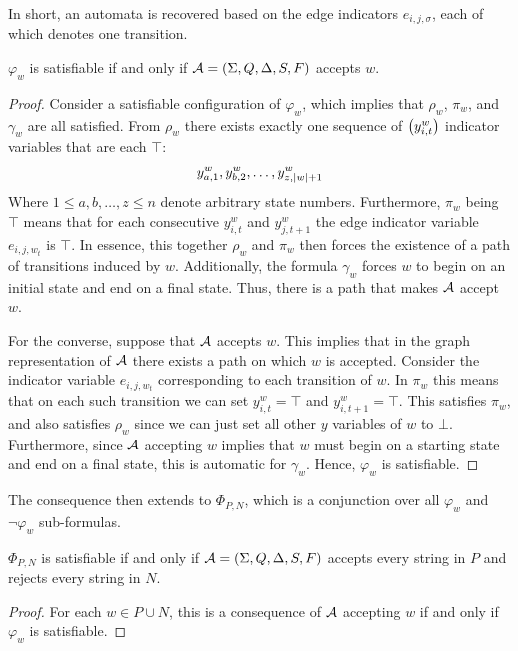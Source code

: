 In short, an automata is recovered based on the edge indicators
\(e_{i, j, \sigma}\),
each of which denotes one transition.

\begin{theorem}
  \(\varphi_w\) is satisfiable if and only if
  \(\mathcal{A} = \left(\Sigma, Q, \Delta, S, F\right)\) accepts \(w\).
\end{theorem}
\begin{proof}
  Consider a satisfiable configuration of \(\varphi_w\),
  which implies that \(\rho_w\), \(\pi_w\), and \(\gamma_w\)
  are all satisfied.
  From \(\rho_w\)
  there exists exactly one sequence of \(\left(y_{i, t}^w\right)\)
  indicator variables that are each \(\top\):
  \begin{align*}
    y_{a, 1}^w, y_{b, 2}^w, \ldots, y_{z, \left\lvert w\right\rvert + 1}^w
  \end{align*}
  Where \(1 \leq a, b, \ldots, z \leq n\) denote arbitrary state numbers.
  Furthermore, \(\pi_w\) being \(\top\) means that for each consecutive
  \(y_{i, t}^w\) and \(y_{j, t + 1}^w\) the edge indicator variable
  \(e_{i, j, w_{t}}\) is \(\top\).
  In essence, this together \(\rho_w\) and \(\pi_w\) then forces
  the existence of a path of transitions induced by \(w\).
  Additionally, the formula \(\gamma_w\) forces \(w\) to begin on an
  initial state and end on a final state.
  Thus, there is a path that makes \(\mathcal{A}\) accept \(w\).

  For the converse, suppose that \(\mathcal{A}\) accepts \(w\).
  This implies that in the graph representation of \(\mathcal{A}\)
  there exists a path on which \(w\) is accepted.
  Consider the indicator variable \(e_{i, j, w_t}\) corresponding to each
  transition of \(w\).
  In \(\pi_w\) this means that on each such transition we can set
  \(y_{i, t}^w = \top\) and \(y_{i, t + 1}^w = \top\).
  This satisfies \(\pi_w\),
  and also satisfies \(\rho_w\) since we can just set all other
  \(y\) variables of \(w\) to \(\bot\).
  Furthermore, since \(\mathcal{A}\) accepting \(w\) implies that
  \(w\) must begin on a starting state and end on a final state,
  this is automatic for \(\gamma_w\).
  Hence, \(\varphi_w\) is satisfiable.

\end{proof}

The consequence then extends to \(\Phi_{P, N}\),
which is a conjunction over all \(\varphi_w\) and \(\neg \varphi_w\)
sub-formulas.

\begin{theorem}
  \(\Phi_{P, N}\) is satisfiable if and only if
  \(\mathcal{A} = \left(\Sigma, Q, \Delta, S, F\right)\) accepts every string
  in \(P\) and rejects every string in \(N\).
\end{theorem}
\begin{proof}
  For each \(w \in P \cup N\),
  this is a consequence of \(\mathcal{A}\) accepting \(w\)
  if and only if \(\varphi_w\) is satisfiable.
\end{proof}


